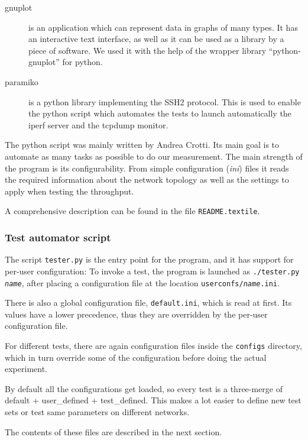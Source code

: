 \begin{description}
	\item[gnuplot]
		is an application which can represent data in graphs of many types. It has an interactive text interface, as well as it can be used as a library by a piece of software. We used it with the help of the wrapper library ``python-gnuplot'' for python.

	\item[paramiko]
		is a python library implementing the SSH2 protocol.	
	This is used to enable the python script which automates the tests to launch automatically the iperf server and the tcpdump monitor.

\end{description}
%
The python script was mainly written by Andrea Crotti.  Its main goal is to
automate as many tasks as possible to do our measurement.  The main strength
of the program is its configurability.  From simple configuration ({\em ini})
files it reads the required information about the network topology as well as
the settings to apply when testing the throughput.

A comprehensive description can be found in the file {\tt README.textile}.


\subsubsection{Test automator script}

\noindent
The script \verb|tester.py| is the entry point for the program, and it has support for per-user configuration:
To invoke a test, the program is launched as {\tt ./tester.py \textit{name}},
after placing a configuration file at the location {\tt userconfs/\textit{name}.ini}.\newline

There is also a global configuration file, {\tt default.ini}, which is read at first.
Its values have a lower precedence, thus they are overridden by the per-user configuration file.

For different tests, there are again configuration files inside the {\tt configs} directory, which in turn override some of the configuration before doing the actual experiment.

By default all the configurations get loaded, so every test is a three-merge of default + user\_defined + test\_defined.\newline
This makes a lot easier to define new test sets or test same parameters on different networks.

The contents of these files are described in the next section.



